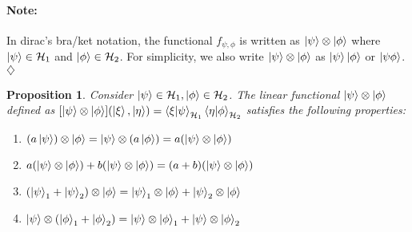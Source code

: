 \documentclass[12pt,twoside,fleqn]{report}
\makeatletter
\theoremstyle{thmstyle}
\renewenvironment{proof}[1][\proofname]{\par
\pushQED{\qed}%
\normalfont \topsep6\p@\@plus6\p@\relax
\trivlist
\item[\hskip\labelsep\itshape#1\@addpunct{.}]\mbox{}\par\nobreak\ignorespaces
}{%
    \popQED\endtrivlist\@endpefalse
    }
\newtheorem{prop}{Proposition}[chapter]
\newenvironment{note}{\paragraph{\textbf{Note:}}}{\hfill\ensuremath{\diamondsuit}}
\makeatother
\begin{document}
\begin{note}
    In dirac's bra/ket notation, the functional $f_{\psi,\phi}$ is written as $\ket{\psi} \otimes \ket{\phi}$ where $\ket{\psi} \in \mathcal{H}_1$ and $\ket{\phi} \in \mathcal{H}_2$.
    For simplicity, we also write $\ket{\psi} \otimes \ket{\phi}$ as $\ket{\psi}\ket{\phi}$ or $\ket{\psi\phi}$.
\end{note}


\begin{prop}
    Consider $\ket\psi \in \mathcal{H}_1, \ket\phi \in \mathcal{H}_2$.
    The linear functional $\ket{\psi} \otimes \ket{\phi}$ defined as $[\ket\psi \otimes \ket\phi](\ket\xi,\ket\eta) = \braket{\xi|\psi}_{\mathcal{H}_1}\braket{\eta|\phi}_{\mathcal{H}_2}$  satisfies the following properties:
    \begin{enumerate}
        \item $(a \ket\psi) \otimes \ket\phi = \ket\psi \otimes (a \ket\phi) = a (\ket\psi \otimes \ket\phi)$
        \item $a (\ket\psi \otimes \ket\phi) + b (\ket\psi \otimes \ket\phi) = (a + b) (\ket\psi \otimes \ket\phi)$
        \item $(\ket\psi_1 + \ket\psi_2) \otimes \ket\phi = \ket\psi_1 \otimes \ket\phi + \ket\psi_2 \otimes \ket\phi$
        \item $\ket\psi \otimes (\ket\phi_1 + \ket\phi_2) = \ket\psi \otimes \ket\phi_1 + \ket\psi \otimes \ket\phi_2$
    \end{enumerate}
\end{prop}
\begin{proof}
\end{proof}
\end{document}
